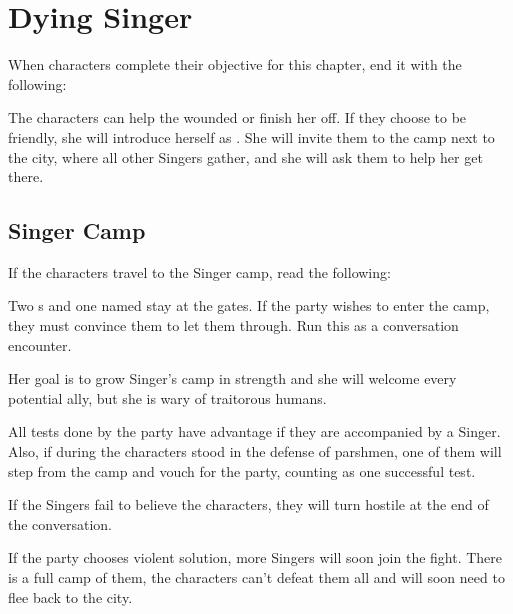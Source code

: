 \section{Dying Singer}
\label{sec:dyingSinger}

When characters complete their objective for this chapter, end it with the following:


The characters can help the wounded or finish her off. If they choose to be friendly, she will introduce herself as \npcSingerWouned{}. She will invite them to the camp next to the city, where all other Singers gather, and she will ask them to help her get there.


\newpage
\subsection{Singer Camp}

If the characters travel to the Singer camp, read the following:


Two \enemySingerWarform{}s and one \enemySingerEnvoyform{} named \npcSingerEnvoy{} stay at the gates. If the party wishes to enter the camp, they must convince them to let them through. Run this as a conversation encounter.

Her goal is to grow Singer's camp in strength and she will welcome every potential ally, but she is wary of traitorous humans. 

All tests done by the party have advantage if they are accompanied by a Singer. Also, if during  the characters stood in the defense of parshmen, one of them will step from the camp and vouch for the party, counting as one successful test.

If the Singers fail to believe the characters, they will turn hostile at the end of the conversation.

If the party chooses violent solution, more Singers will soon join the fight. There is a full camp of them, the characters can't defeat them all and will soon need to flee back to the city.